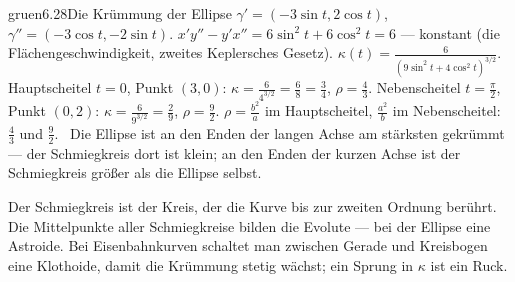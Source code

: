 \begin{loesungkarte}{gruen}{6.28}{Die Krümmung der Ellipse}
$\gamma' = (-3\sin t, 2\cos t)$, $\gamma'' = (-3\cos t, -2\sin t)$. $x'y'' - y'x'' = 6\sin^{2}t + 6\cos^{2}t = 6$ --- konstant (die Flächengeschwindigkeit, zweites Keplersches Gesetz).
$\kappa(t) = \frac6{(9\sin^{2}t + 4\cos^{2}t)^{3/2}}$. Hauptscheitel $t = 0$, Punkt $(3, 0)$: $\kappa = \frac6{4^{3/2}} = \frac68 = \frac34$, $\rho = \frac43$. Nebenscheitel $t = \frac\pi2$, Punkt $(0, 2)$: $\kappa = \frac6{9^{3/2}} = \frac29$, $\rho = \frac92$.
$\rho = \frac{b^{2}}a$ im Hauptscheitel, $\frac{a^{2}}b$ im Nebenscheitel: $\frac43$ und $\frac92$. \checkmark\ Die Ellipse ist an den Enden der langen Achse am stärksten gekrümmt --- der Schmiegkreis dort ist klein; an den Enden der kurzen Achse ist der Schmiegkreis größer als die Ellipse selbst.
\begin{mitnehmen}\kastentext
Der Schmiegkreis ist der Kreis, der die Kurve bis zur zweiten Ordnung berührt. Die Mittelpunkte aller Schmiegkreise bilden die Evolute --- bei der Ellipse eine Astroide. Bei Eisenbahnkurven schaltet man zwischen Gerade und Kreisbogen eine Klothoide, damit die Krümmung stetig wächst; ein Sprung in $\kappa$ ist ein Ruck.
\end{mitnehmen}
\end{loesungkarte}

